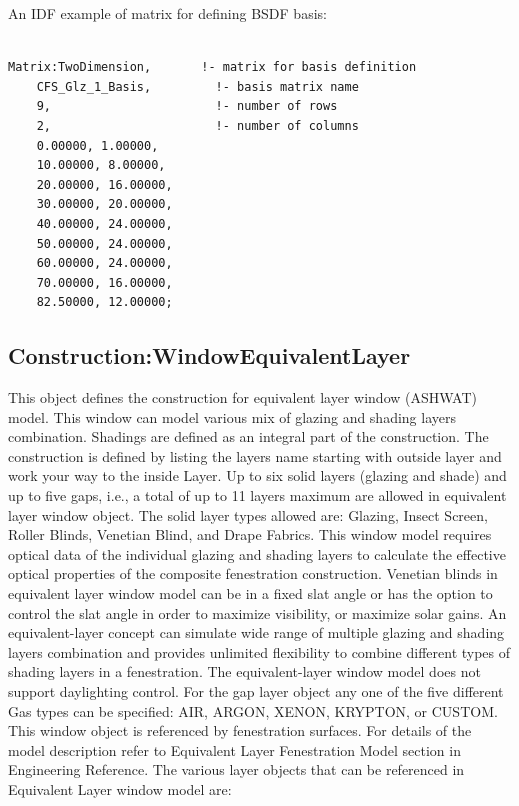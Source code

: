 An IDF example of matrix for defining BSDF basis:

\begin{lstlisting}

Matrix:TwoDimension,       !- matrix for basis definition
    CFS_Glz_1_Basis,         !- basis matrix name
    9,                       !- number of rows
    2,                       !- number of columns
    0.00000, 1.00000,
    10.00000, 8.00000,
    20.00000, 16.00000,
    30.00000, 20.00000,
    40.00000, 24.00000,
    50.00000, 24.00000,
    60.00000, 24.00000,
    70.00000, 16.00000,
    82.50000, 12.00000;
\end{lstlisting}

\subsection{Construction:WindowEquivalentLayer}\label{constructionwindowequivalentlayer}

This object defines the construction for equivalent layer window (ASHWAT) model. This window can model various mix of glazing and shading layers combination. Shadings are defined as an integral part of the construction. The construction is defined by listing the layers name starting with outside layer and work your way to the inside Layer. Up to six solid layers (glazing and shade) and up to five gaps, i.e., a total of up to 11 layers maximum are allowed in equivalent layer window object. The solid layer types allowed are: Glazing, Insect Screen, Roller Blinds, Venetian Blind, and Drape Fabrics. This window model requires optical data of the individual glazing and shading layers to calculate the effective optical properties of the composite fenestration construction. Venetian blinds in equivalent layer window model can be in a fixed slat angle or has the option to control the slat angle in order to maximize visibility, or maximize solar gains. An equivalent-layer concept can simulate wide range of multiple glazing and shading layers combination and provides unlimited flexibility to combine different types of shading layers in a fenestration. The equivalent-layer window model does not support daylighting control. For the gap layer object any one of the five different Gas types can be specified: AIR, ARGON, XENON, KRYPTON, or CUSTOM. This window object is referenced by fenestration surfaces. For details of the model description refer to Equivalent Layer Fenestration Model section in Engineering Reference. The various layer objects that can be referenced in Equivalent Layer window model are:

